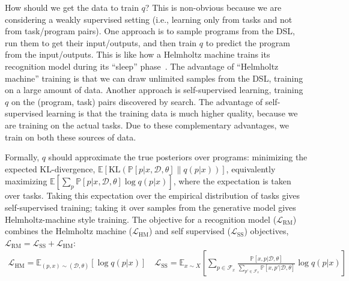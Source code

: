 \documentclass{article}
\newcommand{\system}{\textsc{EC$^2$} }
\newcommand{\expect}{\mathds{E}} %
\newcommand{\probability}{\mathds{P}} %
\begin{document}
How should we get the data to train $q$?
This is non-obvious  because we are considering a weakly supervised setting (i.e., learning only from tasks and not from task/program pairs).
One approach is to sample programs from the DSL,
run them to get their input/outputs,
and then train $q$ to predict the program from the input/outputs.
This is like how a Helmholtz machine
trains its recognition model during its ``sleep'' phase~\cite{dayan1995helmholtz}.
The advantage of ``Helmholtz machine'' training is that
we can draw unlimited samples from the DSL,
training on a large amount of data.
Another approach is
 self-supervised learning,
training $q$ on the (program, task)
pairs discovered by search.
The advantage of self-supervised learning
is that the training data is much higher quality,
because we are training on the actual tasks.
Due to these complementary advantages,
we train on both these sources of data.

Formally, $q$ should approximate the true posteriors over programs: minimizing the expected KL-divergence, $  \expect\left[\text{KL}\left(\probability[p|x,\mathcal{D},\theta]\|q(p|x) \right) \right]$,
 equivalently maximizing $  \expect[\sum_p\probability[p|x,\mathcal{D},\theta]\log q(p|x) ]$,
 where the expectation is taken over tasks. Taking this expectation over the empirical distribution of tasks gives self-supervised training; taking it over samples from the generative model gives  Helmholtz-machine style training.
 The  objective for a recognition model ($\mathcal{L}_{\text{RM}}$) combines the Helmholtz machine ($\mathcal{L}_{\text{HM}}$) and self supervised ($\mathcal{L}_{\text{SS}}$) objectives, $\mathcal{L}_{\text{RM}} = \mathcal{L}_\text{SS} + \mathcal{L}_\text{HM}$:
\begin{align}\nonumber
\mathcal{L}_{\text{HM}} = \expect_{(p,x)\sim(\mathcal{D},\theta) }\left[\log q(p|x)\right]\quad
\mathcal{L}_{\text{SS}} = \expect_{x\sim X}\left[\sum_{p\in \mathcal{F}_x}
  \frac{\probability\left[x,p|\mathcal{D},\theta \right]}{\sum_{p'\in \mathcal{F}_x}\probability\left[x,p'|\mathcal{D},\theta \right]}\log q(p|x)\right]
\end{align}

\end{document}
